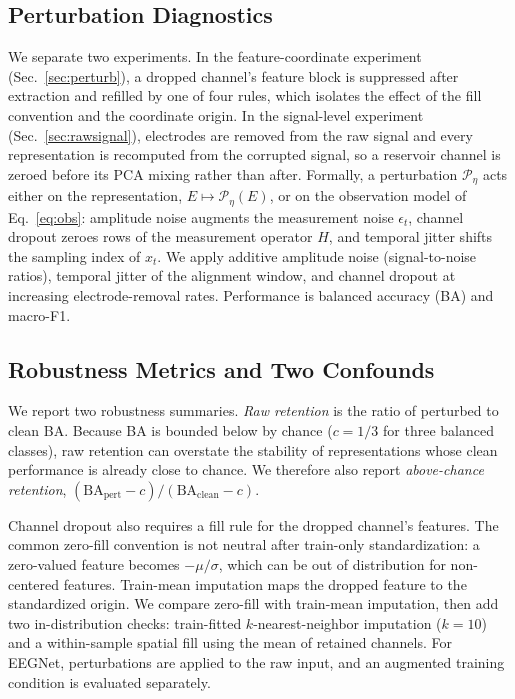 \documentclass[conference]{IEEEtran}
\begin{document}
\subsection{Perturbation Diagnostics}
We separate two experiments. In the feature-coordinate experiment (Sec.~\ref{sec:perturb}), a dropped channel's feature block is suppressed after extraction and refilled by one of four rules, which isolates the effect of the fill convention and the coordinate origin. In the signal-level experiment (Sec.~\ref{sec:rawsignal}), electrodes are removed from the raw signal and every representation is recomputed from the corrupted signal, so a reservoir channel is zeroed before its PCA mixing rather than after. Formally, a perturbation $\mathcal{P}_\eta$ acts either on the representation, $E\mapsto\mathcal{P}_\eta(E)$, or on the observation model of Eq.~\eqref{eq:obs}: amplitude noise augments the measurement noise $\epsilon_t$, channel dropout zeroes rows of the measurement operator $H$, and temporal jitter shifts the sampling index of $x_t$. We apply additive amplitude noise (signal-to-noise ratios), temporal jitter of the alignment window, and channel dropout at increasing electrode-removal rates. Performance is balanced accuracy (BA) and macro-F1.

\subsection{Robustness Metrics and Two Confounds}
\label{sec:confound}
We report two robustness summaries. \emph{Raw retention} is the ratio of perturbed to clean BA. Because BA is bounded below by chance ($c=1/3$ for three balanced classes), raw retention can overstate the stability of representations whose clean performance is already close to chance. We therefore also report \emph{above-chance retention}, $(\mathrm{BA}_{\mathrm{pert}}-c)/(\mathrm{BA}_{\mathrm{clean}}-c)$.

Channel dropout also requires a fill rule for the dropped channel's features. The common zero-fill convention is not neutral after train-only standardization: a zero-valued feature becomes $-\mu/\sigma$, which can be out of distribution for non-centered features. Train-mean imputation maps the dropped feature to the standardized origin. We compare zero-fill with train-mean imputation, then add two in-distribution checks: train-fitted $k$-nearest-neighbor imputation ($k{=}10$) and a within-sample spatial fill using the mean of retained channels. For EEGNet, perturbations are applied to the raw input, and an augmented training condition is evaluated separately.
\end{document}
